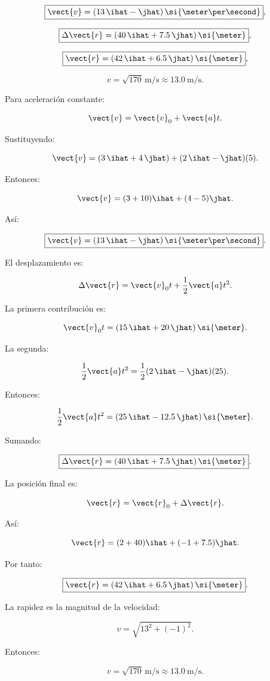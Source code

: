 \begin{respuesta}
\[
\boxed{
\vect{v}
=
(13\,\ihat-\jhat)\,
\si{\meter\per\second}
},
\]

\[
\boxed{
\Delta\vect{r}
=
(40\,\ihat+7.5\,\jhat)\,\si{\meter}
},
\]

\[
\boxed{
\vect{r}
=
(42\,\ihat+6.5\,\jhat)\,\si{\meter}
},
\]

\[
\boxed{
v=\sqrt{170}\,\si{\meter\per\second}
\approx
\SI{13.0}{\meter\per\second}
}.
\]
\end{respuesta}

\begin{explicacion}
Para aceleración constante:

\[
\vect{v}
=
\vect{v}_0+\vect{a}t.
\]

Sustituyendo:

\[
\vect{v}
=
(3\,\ihat+4\,\jhat)
+
(2\,\ihat-\jhat)(5).
\]

Entonces:

\[
\vect{v}
=
(3+10)\ihat+(4-5)\jhat.
\]

Así:

\[
\boxed{
\vect{v}
=
(13\,\ihat-\jhat)\,
\si{\meter\per\second}
}.
\]

El desplazamiento es:

\[
\Delta\vect{r}
=
\vect{v}_0t+\frac{1}{2}\vect{a}t^2.
\]

La primera contribución es:

\[
\vect{v}_0t
=
(15\,\ihat+20\,\jhat)\,\si{\meter}.
\]

La segunda:

\[
\frac{1}{2}\vect{a}t^2
=
\frac{1}{2}
(2\,\ihat-\jhat)(25).
\]

Entonces:

\[
\frac{1}{2}\vect{a}t^2
=
(25\,\ihat-12.5\,\jhat)\,\si{\meter}.
\]

Sumando:

\[
\boxed{
\Delta\vect{r}
=
(40\,\ihat+7.5\,\jhat)\,\si{\meter}
}.
\]

La posición final es:

\[
\vect{r}
=
\vect{r}_0+\Delta\vect{r}.
\]

Así:

\[
\vect{r}
=
(2+40)\ihat+(-1+7.5)\jhat.
\]

Por tanto:

\[
\boxed{
\vect{r}
=
(42\,\ihat+6.5\,\jhat)\,\si{\meter}
}.
\]

La rapidez es la magnitud de la velocidad:

\[
v
=
\sqrt{13^2+(-1)^2}.
\]

Entonces:

\[
\boxed{
v
=
\sqrt{170}\,\si{\meter\per\second}
\approx
\SI{13.0}{\meter\per\second}
}.
\]
\end{explicacion}


